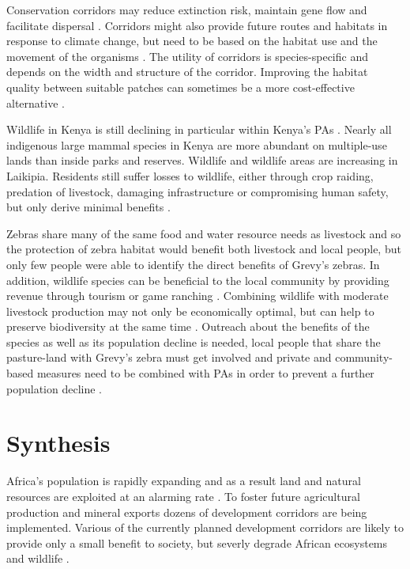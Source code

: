 \documentclass[12pt,a4paper, twoside, english]{article}
\begin{document}
Conservation corridors may reduce extinction risk, maintain gene flow and facilitate dispersal \citep{Corlatti2009, LaPoint2013}. Corridors might also provide future routes and habitats in response to climate change, but need to be based on the habitat use and the movement of the organisms \citep{Chetkiewicz2006}. The utility of corridors is species-specific and depends on the width and structure of the corridor. Improving the habitat quality between suitable patches can sometimes be a more cost-effective alternative \citep{Makelainen2016}.


Wildlife in Kenya is still declining in particular within Kenya's PAs \citep{Western2009}. Nearly all indigenous large mammal species in Kenya are more abundant on multiple-use lands than inside parks and reserves. Wildlife and wildlife areas are increasing in Laikipia. Residents still suffer losses to wildlife, either through crop raiding, predation of livestock, damaging infrastructure or compromising human safety, but only derive minimal benefits \citep{Young2005, Gadd2005, Bond2014a}. 

Zebras share many of the same food and water resource needs as livestock and so the protection of zebra habitat would benefit both livestock and local people, but only few people were able to identify the direct benefits of Grevy's zebras. In addition, wildlife species can be beneficial to the local community by providing revenue through tourism or game ranching \citep{Sundaresan2012}. Combining wildlife with moderate livestock production may not only be economically optimal, but can help to preserve biodiversity at the same time \citep{Young1997a}. Outreach about the benefits of the species as well as its population decline is needed, local people that share the pasture-land with Grevy’s zebra must get involved and private and community-based measures need to be combined with PAs in order to prevent a further population decline \citep{Western2009, Sundaresan2012}.

\newpage
\section{Synthesis}


Africa's population is rapidly expanding and as a result land and natural resources are exploited at an alarming rate \citep{Edwards2014, Caro2014, Searchinger2015}. To foster future agricultural production \citep{Weng2013} and mineral exports \citep{Edwards2014} dozens of development corridors are being implemented. Various of the currently planned development corridors are likely to provide only a small benefit to society, but severly degrade African ecosystems and wildlife \citep{Laurance2015}.
\end{document}

